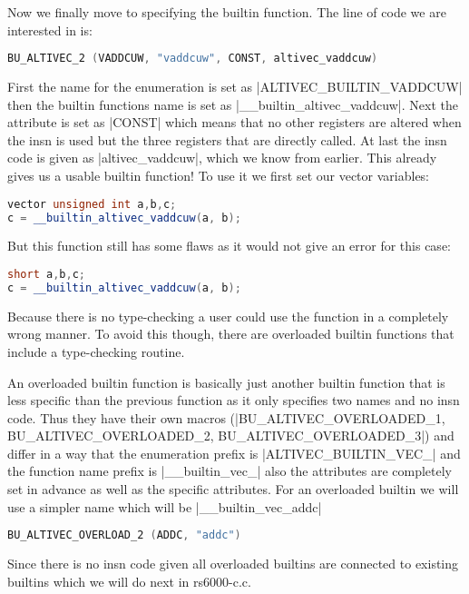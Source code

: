 Now we finally move to specifying the builtin function. The line of code we are interested in is:
\begin{lstlisting}[language=C++,basicstyle=\ttfamily\scriptsize,keywordstyle=\color{red}]
BU_ALTIVEC_2 (VADDCUW, "vaddcuw", CONST, altivec_vaddcuw)
\end{lstlisting}
First the name for the enumeration is set as |ALTIVEC_BUILTIN_VADDCUW| then the builtin functions name is set as |__builtin_altivec_vaddcuw|. Next the attribute is set as |CONST| which means that no other registers are altered when the insn is used but the three registers that are directly called. At last the insn code is given as |altivec_vaddcuw|, which we know from earlier. This already gives us a usable builtin function! To use it we first set our vector variables:
\begin{lstlisting}[language=C++,basicstyle=\ttfamily\scriptsize,keywordstyle=\color{red}]
vector unsigned int a,b,c;
c = __builtin_altivec_vaddcuw(a, b);
\end{lstlisting}
But this function still has some flaws as it would not give an error for this case:
\begin{lstlisting}[language=C++,basicstyle=\ttfamily\scriptsize,keywordstyle=\color{red}]
short a,b,c;
c = __builtin_altivec_vaddcuw(a, b);
\end{lstlisting}
Because there is no type-checking a user could use the function in a completely wrong manner. To avoid this though, there are overloaded builtin functions that include a type-checking routine.

An overloaded builtin function is basically just another builtin function that is less specific than the previous function as it only specifies two names and no insn code. Thus they have their own macros (|BU_ALTIVEC_OVERLOADED_1, BU_ALTIVEC_OVERLOADED_2, BU_ALTIVEC_OVERLOADED_3|) and differ in a way that the enumeration prefix is |ALTIVEC_BUILTIN_VEC_| and the function name prefix is |__builtin_vec_| also the attributes are completely set in advance as well as the specific attributes.
For an overloaded builtin we will use a simpler name which will be  |__builtin_vec_addc|
\begin{lstlisting}[language=C++,basicstyle=\ttfamily\scriptsize,keywordstyle=\color{red}]
BU_ALTIVEC_OVERLOAD_2 (ADDC, "addc")
\end{lstlisting}
Since there is no insn code given all overloaded builtins are connected to existing builtins which we will do next in rs6000-c.c.

